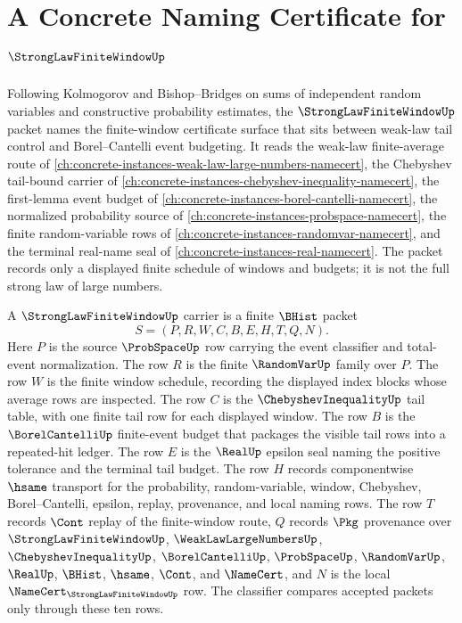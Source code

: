 \chapter{A Concrete Naming Certificate for $\StrongLawFiniteWindowUp$}
\label{ch:concrete-instances-strong-law-finite-window-namecert}

Following Kolmogorov and Bishop--Bridges on sums of independent random variables and constructive probability estimates, the $\StrongLawFiniteWindowUp$ packet names the finite-window certificate surface that sits between weak-law tail control and Borel--Cantelli event budgeting. It reads the weak-law finite-average route of \autoref{ch:concrete-instances-weak-law-large-numbers-namecert}, the Chebyshev tail-bound carrier of \autoref{ch:concrete-instances-chebyshev-inequality-namecert}, the first-lemma event budget of \autoref{ch:concrete-instances-borel-cantelli-namecert}, the normalized probability source of \autoref{ch:concrete-instances-probspace-namecert}, the finite random-variable rows of \autoref{ch:concrete-instances-randomvar-namecert}, and the terminal real-name seal of \autoref{ch:concrete-instances-real-namecert}. The packet records only a displayed finite schedule of windows and budgets; it is not the full strong law of large numbers.

\begin{definition}\label{def:strong-law-finite-window-carrier}
A $\StrongLawFiniteWindowUp$ carrier is a finite $\BHist$ packet
$$
S=(P,R,W,C,B,E,H,T,Q,N).
$$
Here $P$ is the source $\ProbSpaceUp$ row carrying the event classifier and total-event normalization. The row $R$ is the finite $\RandomVarUp$ family over $P$. The row $W$ is the finite window schedule, recording the displayed index blocks whose average rows are inspected. The row $C$ is the $\ChebyshevInequalityUp$ tail table, with one finite tail row for each displayed window. The row $B$ is the $\BorelCantelliUp$ finite-event budget that packages the visible tail rows into a repeated-hit ledger. The row $E$ is the $\RealUp$ epsilon seal naming the positive tolerance and the terminal tail budget. The row $H$ records componentwise $\hsame$ transport for the probability, random-variable, window, Chebyshev, Borel--Cantelli, epsilon, replay, provenance, and local naming rows. The row $T$ records $\Cont$ replay of the finite-window route, $Q$ records $\Pkg$ provenance over $\StrongLawFiniteWindowUp$, $\WeakLawLargeNumbersUp$, $\ChebyshevInequalityUp$, $\BorelCantelliUp$, $\ProbSpaceUp$, $\RandomVarUp$, $\RealUp$, $\BHist$, $\hsame$, $\Cont$, and $\NameCert$, and $N$ is the local $\NameCert_{\StrongLawFiniteWindowUp}$ row. The classifier compares accepted packets only through these ten rows.
\end{definition}

